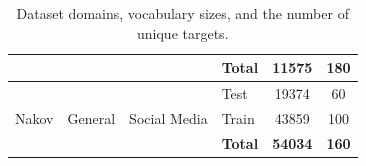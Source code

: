 \documentclass[12pt, a4paper]{report}
\theoremstyle{definition}
\theoremstyle{definition}%
\theoremstyle{definition}%
\theoremstyle{definition}%
\theoremstyle{definition}%
\theoremstyle{definition}%
\begin{document}
\begin{table}
\begin{tabular}{|l|l|l|l|c|c|}
		                                       &                                      &                                    & \textbf{Total}                      & \textbf{11575}                     & \textbf{180}                       \\ \hline\hline
		\multirow{3}{*}{Nakov}                 & \multirow{3}{*}{General}             & \multirow{3}{*}{Social Media}      & Test                                & 19374                              & 60                                 \\
		                                       &                                      &                                    & Train                               & 43859                              & 100                                \\ \cline{4-6}
		                                       &                                      &                                    & \textbf{Total}                      & \textbf{54034}                     & \textbf{160}                       \\ \hline
	\end{tabular}
	\caption{Dataset domains, vocabulary sizes, and the number of unique targets.}
	\label{tab:dataset_domain_vocab}
\end{table}
\end{document}
